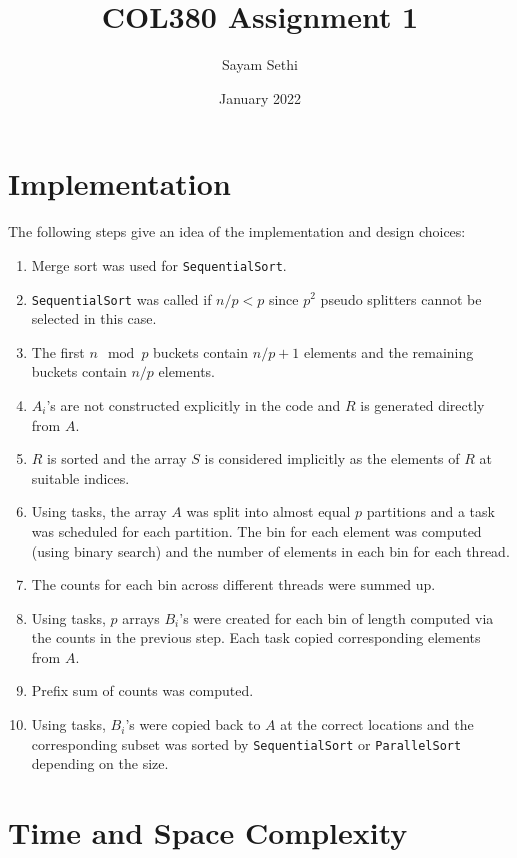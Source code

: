 \documentclass[11pt]{article}
\title{COL380 Assignment 1}
\author{Sayam Sethi}
\date{January 2022}
\begin{document}
\maketitle

\tableofcontents

\section{Implementation}
The following steps give an idea of the implementation and design choices:
\begin{enumerate}
	\item Merge sort was used for \texttt{SequentialSort}.
	\item \texttt{SequentialSort} was called if $n / p < p$ since $p^2$ pseudo splitters cannot be selected in this case.
	\item The first $n\mod p$ buckets contain $n/p + 1$ elements and the remaining buckets contain $n/p$ elements.
	\item $A_i$'s are not constructed explicitly in the code and $R$ is generated directly from $A$.
	\item $R$ is sorted and the array $S$ is considered implicitly as the elements of $R$ at suitable indices.
	\item Using tasks, the array $A$ was split into almost equal $p$ partitions and a task was scheduled for each partition. The bin for each element was computed (using binary search) and the number of elements in each bin for each thread.
	\item The counts for each bin across different threads were summed up.
	\item Using tasks, $p$ arrays $B_i$'s were created for each bin of length computed via the counts in the previous step. Each task copied corresponding elements from $A$.
	\item Prefix sum of counts was computed.
	\item Using tasks, $B_i$'s were copied back to $A$ at the correct locations and the corresponding subset was sorted by \texttt{SequentialSort} or \texttt{ParallelSort} depending on the size.
\end{enumerate}

\section{Time and Space Complexity}
\end{document}
